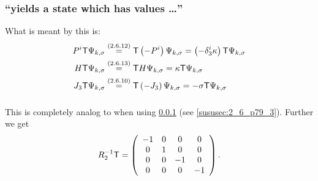 \subsubsection{\enquote{\timereversal yields a state which has values \dots} }\label{sususec:2_6_p79_2}
What is meant by this is:
\begin{align*} 
	P^i \mathsf{T} \Psi_{k,\sigma}&\overset{({2.6.12})}{=} \mathsf{T} \left(-P^i\right)\Psi_{k,\sigma}=\left(-\delta^i_3\kappa\right)\mathsf{T}\Psi_{k,\sigma}\\
	H \mathsf{T} \Psi_{k,\sigma}&\overset{({2.6.13})}{=} \mathsf{T} H \Psi_{k,\sigma} =\kappa \mathsf{T}\Psi_{k,\sigma}\\
	J_3 \mathsf{T} \Psi_{k,\sigma}&\overset{({2.6.10})}{=} \mathsf{T} \left(-J_3\right) \Psi_{k,\sigma} = -\sigma \mathsf{T} \Psi_{k,\sigma}
\end{align*}

\subsubsection{ }
This is completely analog to  when using \ref{sususec:2_6_p79_2} (see \ref{sususec:2_6_p79_3}).
Further we get
\[R_2^{-1}\mathsf{T}=\left(
\begin{array}{cccc}
	-1 & 0 & 0 & 0 \\
	0 & 1 & 0 & 0 \\
	0 & 0 & -1 & 0 \\
	0 & 0 & 0 & -1
\end{array}
\right).\]

